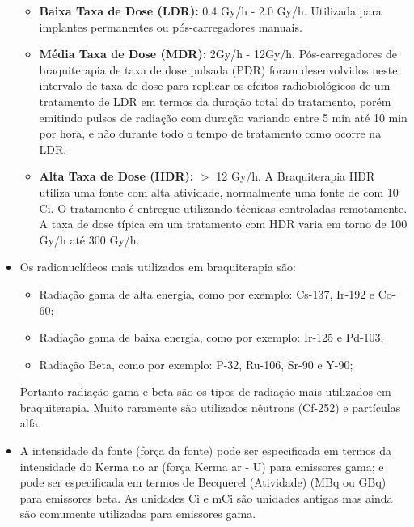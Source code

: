 \documentclass[11pt,a4paper]{article}
\newcounter{exemplo}
\begin{document}
\begin{exemplo}[Braquiterapia]
\begin{itemize}
            \begin{itemize}[label=\textcolor{CarnationPink}{\textopenbullet}]
                \item \textcolor{CarnationPink}{\textbf{Baixa Taxa de Dose (LDR):}} 0.4 Gy/h - 2.0 Gy/h. Utilizada para implantes permanentes ou pós-carregadores manuais. 
                \item \textcolor{CarnationPink}{\textbf{Média Taxa de Dose (MDR):}} 2Gy/h - 12Gy/h. Pós-carregadores de braquiterapia de taxa de dose pulsada (PDR) foram desenvolvidos neste intervalo de taxa de dose para replicar os efeitos radiobiológicos de um tratamento de LDR em termos da duração total do tratamento, porém emitindo pulsos de radiação com duração variando entre 5 min até 10 min por hora, e não durante todo o tempo de tratamento como ocorre na LDR.
                \item \textcolor{CarnationPink}{\textbf{Alta Taxa de Dose (HDR):}} $>$ 12 Gy/h. A Braquiterapia HDR utiliza uma fonte com alta atividade, normalmente uma fonte de  com 10 Ci. O tratamento é entregue utilizando técnicas controladas remotamente. A taxa de dose típica em um tratamento com HDR varia em torno de 100 Gy/h até 300 Gy/h.
            \end{itemize}

        \item Os radionuclídeos mais utilizados em braquiterapia são:
        
            \begin{itemize}[label=\textcolor{CarnationPink}{\textopenbullet}]
                \item Radiação gama de alta energia, como por exemplo: Cs-137, Ir-192 e Co-60;
                \item Radiação gama de baixa energia, como por exemplo: Ir-125 e Pd-103;
                \item Radiação Beta, como por exemplo: P-32, Ru-106, Sr-90 e Y-90;
            \end{itemize}

            Portanto radiação gama e beta são os tipos de radiação mais utilizados em braquiterapia. Muito raramente são utilizados nêutrons (Cf-252) e partículas alfa. 


        \item A intensidade da fonte (força da fonte) pode ser especificada em termos da intensidade do Kerma no ar (força Kerma ar - U) para emissores gama; e pode ser especificada em termos de Becquerel (Atividade) (MBq ou GBq) para emissores beta. As unidades Ci e mCi são unidades antigas mas ainda são comumente utilizadas para emissores gama.
        

\end{itemize}
\end{exemplo}
\end{document}
